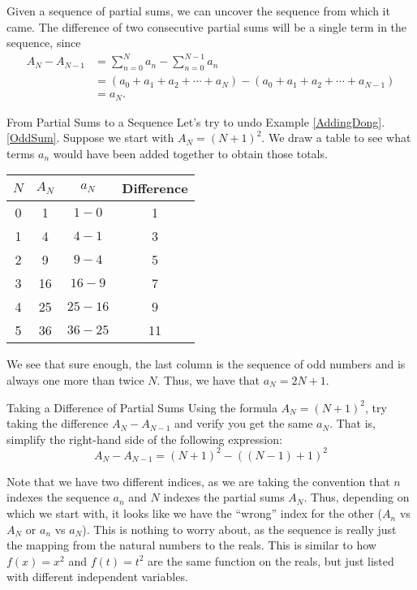 Given a sequence of partial sums, we can uncover the sequence from which it came.  The difference of two consecutive partial sums will be a single term in the sequence, since \begin{align*}
A_{N}-A_{N-1}&=\sum_{n=0}^Na_n-\sum_{n=0}^{N-1}a_n\\ &=\left( a_0+a_1+a_2+\cdots+a_N\right)-\left( a_0+a_1+a_2+\cdots+a_{N-1}\right) \\
&=a_N.
\end{align*}
\begin{example}{From Partial Sums to a Sequence} 
Let's try to undo Example \ref{AddingDong}.\ref{OddSum}.  Suppose we start with $A_N=(N+1)^2$.  We draw a table to see what terms $a_n$ would have been added together to obtain those totals. 
\begin{center}
\begin{tabular}{|c|c|c|c|} \hline
$N$ & $A_N$ & $a_N$ & Difference \\ \hline
0 & 1 & $1-0$ &1 \\
1 & 4 & $4-1$ &3 \\
2 & 9 & $9-4$ &5 \\
3 & 16 & $16-9$ &7 \\
4 & 25 & $25-16$ &9 \\
5 & 36 & $36-25$ &11 \\ \hline
\end{tabular}
\end{center}

We see that sure enough, the last column is the sequence of odd numbers and is always one more than twice $N$.  Thus, we have that $a_N=2N+1$. 

\end{example}

\begin{exercise}{Taking a Difference of Partial Sums \Coffeecup}
Using the formula $A_N=(N+1)^2$, try taking the difference $A_{N}-A_{N-1}$ and verify you get the same $a_N$.  That is, simplify the right-hand side of the following expression: $$ A_{N}-A_{N-1}=(N+1)^2-\left((N-1)+1\right)^2 $$
\end{exercise}


Note that we have two different indices, as we are taking the convention that $n$ indexes the sequence $a_n$ and $N$ indexes the partial sums $A_N$.  Thus, depending on which we start with, it looks like we have the ``wrong'' index for the other ($A_n$ vs $A_N$ or $a_n$ vs $a_N$).  This is nothing to worry about, as the sequence is really just the mapping from the natural numbers to the reals.  This is similar to how $f(x)=x^2$ and $f(t)=t^2$ are the same function on the reals, but just listed with different independent variables.

